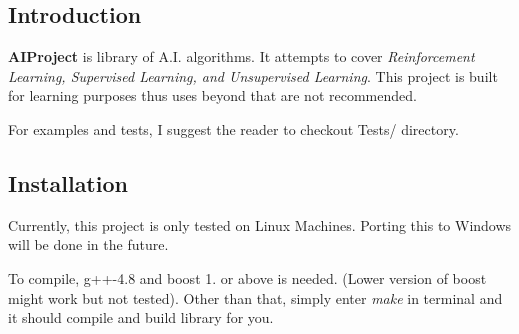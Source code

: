 \subsection*{Introduction}

{\bfseries A\+I\+Project} is library of A.\+I. algorithms. It attempts to cover {\itshape Reinforcement Learning, Supervised Learning, and Unsupervised Learning}. This project is built for learning purposes thus uses beyond that are not recommended.

For examples and tests, I suggest the reader to checkout Tests/ directory.

\subsection*{Installation}

Currently, this project is only tested on Linux Machines. Porting this to Windows will be done in the future.

To compile, g++-\/4.8 and boost 1. or above is needed. (Lower version of boost might work but not tested). Other than that, simply enter {\itshape make} in terminal and it should compile and build library for you. 